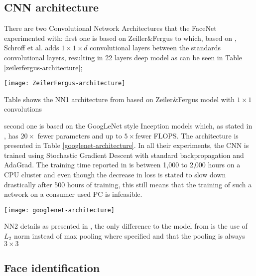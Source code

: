 \subsection{CNN architecture}
There are two Convolutional Network Architectures that the FaceNet experimented with: first one is based on Zeiller\&Fergus \cite{ZeilerF13} to which, based on \cite{LinCY13}, Schroff et al. adds $1 \times 1 \times d$ convolutional layers between the standards convolutional layers, resulting in 22 layers deep model as can be seen in Table \ref{zeilerfergus-architecture};
\begin{table}[h]
	\begin{center}
		\texttt{[image: ZeilerFergus-architecture]}
	\end{center}
	\caption[Zeiler\&Fergus architecture used in FaceNet]{Table shows the NN1 architecture from \cite{SchroffKP15} based on Zeiler\&Fergus model with $1 \times 1$ convolutions}
	\label{zeilerfergus-architecture}
\end{table}
 second one is based on the GoogLeNet style Inception models \cite{DSzegedyLJSRAEVR14} which, as stated in \cite{SchroffKP15}, has $20\times$ fewer parameters and up to $5\times$fewer FLOPS. The architecture is presented in Table \ref{googlenet-architecture}. In all their experiments, the CNN is trained using Stochastic Gradient Descent with standard backpropagation and AdaGrad. The training time reported in \cite{SchroffKP15} is between 1,000 to 2,000 hours on a CPU cluster and even though the decrease in loss is stated to slow down drastically after 500 hours of training, this still means that the training of such a network on a consumer used PC is infeasible. 
 \begin{table}[h]
 	\begin{center}
 		\texttt{[image: googlenet-architecture]}
 	\end{center}
 	\caption[NN2 Inception CNN architecture]{NN2 details as presented in \cite{SchroffKP15}, the only difference to the model from \cite{DSzegedyLJSRAEVR14} is the use of $L_2$ norm instead of max pooling where specified and that the pooling is always $3\times3$}
 	\label{googlenet-architecture}
 \end{table}
\subsection{Face identification} \label{face_recognition}

